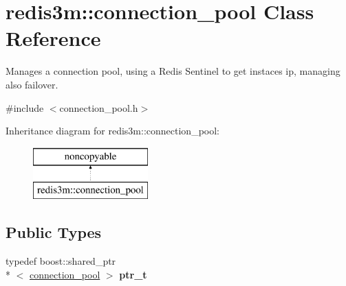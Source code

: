 \hypertarget{classredis3m_1_1connection__pool}{\section{redis3m\-:\-:connection\-\_\-pool Class Reference}
\label{classredis3m_1_1connection__pool}
}


Manages a connection pool, using a Redis Sentinel to get instaces ip, managing also failover.  




{\ttfamily \#include $<$connection\-\_\-pool.\-h$>$}

Inheritance diagram for redis3m\-:\-:connection\-\_\-pool\-:\begin{figure}[H]
\begin{center}
\leavevmode
\includegraphics[height=2.000000cm]{classredis3m_1_1connection__pool}
\end{center}
\end{figure}
\subsection*{Public Types}
\begin{DoxyCompactItemize}
\item 
\hypertarget{classredis3m_1_1connection__pool_ac4288428ed17ad5b4a2247d859d99082}{typedef boost\-::shared\-\_\-ptr\\*
$<$ \hyperlink{classredis3m_1_1connection__pool}{connection\-\_\-pool} $>$ {\bfseries ptr\-\_\-t}}\label{classredis3m_1_1connection__pool_ac4288428ed17ad5b4a2247d859d99082}

\end{DoxyCompactItemize}
